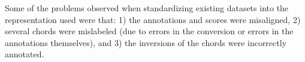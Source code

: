 
Some of the problems observed when standardizing existing
datasets into the representation used were that: 1) the
annotations and scores were misaligned, 2) several chords
were mislabeled (due to errors in the conversion or errors
in the annotations themselves), and 3) the inversions of the
chords were incorrectly annotated.
